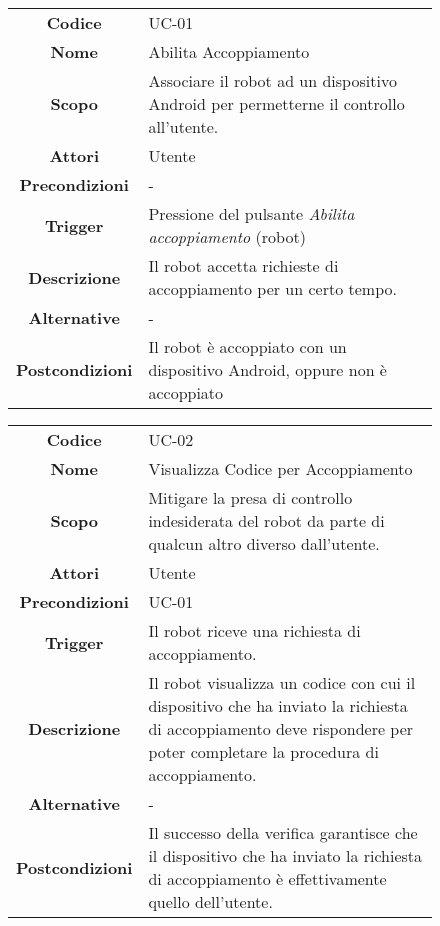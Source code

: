 \documentclass[]{article}
\begin{document}
\begin{figure}[htbp]
\centering
\begin{tabular}{|c|l|}
\hline

\textbf{Codice}
 & 
UC-01
\\

\textbf{Nome}
 & 
Abilita Accoppiamento
\\

\textbf{Scopo}
 & 
Associare il robot ad un dispositivo Android per permetterne il
controllo all'utente.
\\

\textbf{Attori}
 & 
Utente
\\

\textbf{Precondizioni}
 & 
-
\\

\textbf{Trigger}
 & 
Pressione del pulsante \emph{Abilita accoppiamento} (robot)
\\

\textbf{Descrizione}
 & 
Il robot accetta richieste di accoppiamento per un certo tempo.
\\

\textbf{Alternative}
 & 
-
\\

\textbf{Postcondizioni}
 & 
Il robot è accoppiato con un dispositivo Android, oppure non è
accoppiato
\\
\hline
\end{tabular}
\end{figure}

\begin{figure}[htbp]
\centering
\begin{tabular}{|c|l|}
\hline

\textbf{Codice}
 & 
UC-02
\\

\textbf{Nome}
 & 
Visualizza Codice per Accoppiamento
\\

\textbf{Scopo}
 & 
Mitigare la presa di controllo indesiderata del robot da parte di
qualcun altro diverso dall'utente.
\\

\textbf{Attori}
 & 
Utente
\\

\textbf{Precondizioni}
 & 
UC-01
\\

\textbf{Trigger}
 & 
Il robot riceve una richiesta di accoppiamento.
\\

\textbf{Descrizione}
 & 
Il robot visualizza un codice con cui il dispositivo che ha inviato la
richiesta di accoppiamento deve rispondere per poter completare la
procedura di accoppiamento.
\\

\textbf{Alternative}
 & 
-
\\

\textbf{Postcondizioni}
 & 
Il successo della verifica garantisce che il dispositivo che ha inviato
la richiesta di accoppiamento è effettivamente quello dell'utente.
\\
\hline
\end{tabular}
\end{figure}
\end{document}

